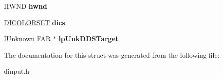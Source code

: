 \begin{DoxyCompactItemize}
\item 
\hypertarget{struct___d_i_c_o_n_f_i_g_u_r_e_d_e_v_i_c_e_s_p_a_r_a_m_s_a_a11b8f2d820ffa8fb9a0c9e566f7759bc}{H\-W\-N\-D {\bfseries hwnd}}\label{struct___d_i_c_o_n_f_i_g_u_r_e_d_e_v_i_c_e_s_p_a_r_a_m_s_a_a11b8f2d820ffa8fb9a0c9e566f7759bc}

\item 
\hypertarget{struct___d_i_c_o_n_f_i_g_u_r_e_d_e_v_i_c_e_s_p_a_r_a_m_s_a_a81e7c19878f46061a4f285c46e69297d}{\hyperlink{struct___d_i_c_o_l_o_r_s_e_t}{D\-I\-C\-O\-L\-O\-R\-S\-E\-T} {\bfseries dics}}\label{struct___d_i_c_o_n_f_i_g_u_r_e_d_e_v_i_c_e_s_p_a_r_a_m_s_a_a81e7c19878f46061a4f285c46e69297d}

\item 
\hypertarget{struct___d_i_c_o_n_f_i_g_u_r_e_d_e_v_i_c_e_s_p_a_r_a_m_s_a_a78490fa95f891b840a84ea943026c7e4}{I\-Unknown F\-A\-R $\ast$ {\bfseries lp\-Unk\-D\-D\-S\-Target}}\label{struct___d_i_c_o_n_f_i_g_u_r_e_d_e_v_i_c_e_s_p_a_r_a_m_s_a_a78490fa95f891b840a84ea943026c7e4}

\end{DoxyCompactItemize}


The documentation for this struct was generated from the following file\-:\begin{DoxyCompactItemize}
\item 
dinput.\-h\end{DoxyCompactItemize}
